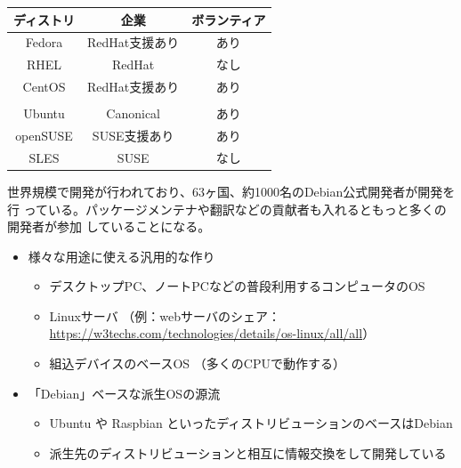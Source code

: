 \documentclass[mingoth,a4paper]{jsarticle}
\begin{document}
\begin{table}[htb]
  \begin{center}
  \begin{tabular}{|c|c|c|}
    \hline
    ディストリ & 企業 & ボランティア \\ \hline
    Fedora & RedHat支援あり & あり  \\ \hline
    RHEL & RedHat & なし  \\ \hline
    CentOS & RedHat支援あり & あり \\ \hline
    \color{red}{Debian}  & \color{red}{なし} & \color{red}{あり} \\ \hline
    Ubuntu  & Canonical & あり \\ \hline
    openSUSE & SUSE支援あり & あり \\ \hline
    SLES & SUSE & なし \\ \hline
  \end{tabular}
  \end{center}
\end{table}



 世界規模で開発が行われており、63ヶ国、約1000名のDebian公式開発者が開発を行
 っている。パッケージメンテナや翻訳などの貢献者も入れるともっと多くの開発者が参加
 していることになる。
 \begin{center}
 \end{center}

\begin{itemize}
  \item 様々な用途に使える汎用的な作り
    \begin{itemize}
    \item デスクトップPC、ノートPCなどの普段利用するコンピュータのOS
    \item Linuxサーバ （例：webサーバのシェア：\url{https://w3techs.com/technologies/details/os-linux/all/all}）
    \item 組込デバイスのベースOS （多くのCPUで動作する）
  \end{itemize}
  \item 「Debian」ベースな派生OSの源流
  \begin{itemize}
    \item Ubuntu や Raspbian といったディストリビューションのベースはDebian
    \item 派生先のディストリビューションと相互に情報交換をして開発している
  \end{itemize}
\end{itemize}
\end{document}
